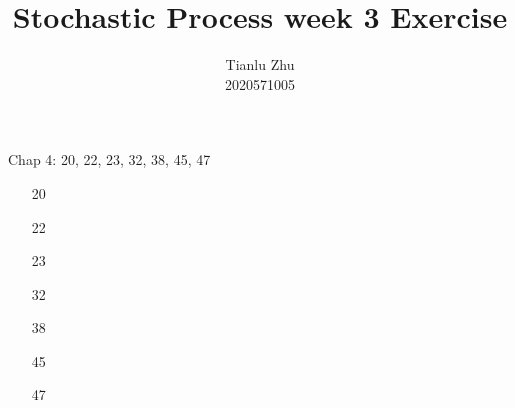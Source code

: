\documentclass[en,hazy,blue,12pt,device = pad]{elegantnote}
\title{Stochastic Process week 3 Exercise}
\author{Tianlu Zhu \\ 2020571005}
\date{}
\begin{document}
\maketitle

Chap 4: 20, 22, 23, 32, 38, 45, 47

\begin{enumerate}
    \item[20]
    \item[22]
    \item[23]
    \item[32] 
    \item[38] 
    \item[45] 
    \item[47]  
\end{enumerate}
\end{document}

